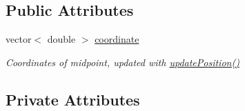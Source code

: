 \subsection*{Public Attributes}
\begin{DoxyCompactItemize}
\item 
vector$<$ double $>$ \hyperlink{classCylinder_a8c7a6cfe1aecf1ee0eff3aaf9c11338f}{coordinate}
\begin{DoxyCompactList}\small\item\em Coordinates of midpoint, updated with \hyperlink{classCylinder_aff701d6f4400ab216431d627c54a0b4e}{update\+Position()} \end{DoxyCompactList}\end{DoxyCompactItemize}
\subsection*{Private Attributes}
